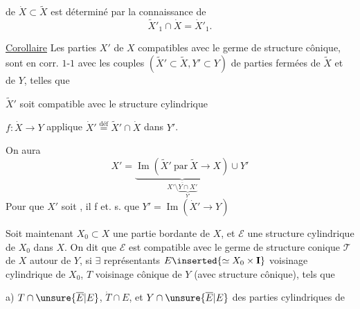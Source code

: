 de $\dot X\subset\widetilde X$ est déterminé par la connaissance de
\[
\widetilde X'_1\cap\dot X=\dot X'_1.
\]

\uline{Corollaire} Les parties  $X'$ de $X$ compatibles avec
le germe de structure cônique, sont en
corr. $1$-$1$ avec les couples $(\widetilde X'\subset\widetilde X,Y'\subset Y)$
de parties fermées de $\widetilde X$ et de $Y$, telles que

 $\widetilde X'$ soit compatible avec le  structure cylindrique

 $f:\dot X\to Y$ applique 
$\dot X'\overset{\text{déf}}{=}\widetilde X'\cap\dot X$ dans $Y'$.

On aura
\[
X'=\underbrace{\operatorname{Im}(\widetilde X'\ \text{par}\ \widetilde X\to X)}
_{\overline{X'\setminus\underbrace{Y\cap X'}_{Y'}}}\cup Y'
\]
Pour que $X'$ soit 
,
il f et. s. que $Y'=\operatorname{Im}(\dot X'\to Y)$

Soit maintenant $X_0\subset X$ une partie
bordante de $X$, et $\mathcal E$ une  structure cylindrique
de $X_0$ dans $X$. On dit que $\mathcal E$ est compatible
avec le germe de structure conique $\mathcal T$
de $X$ autour de $Y$, si $\exists$ représentants
$E\inserted{\simeq X_0\times\mathbf I}$ voisinage cylindrique de $X_0$,  $T$ voisinage
cônique de $Y$ (avec  structure cônique), tels que


a) $T\cap\unsure{\overline E|E}$, $\dot T\cap E$, et $Y\cap\unsure{\overline E|E}$
  des parties cylindriques de

